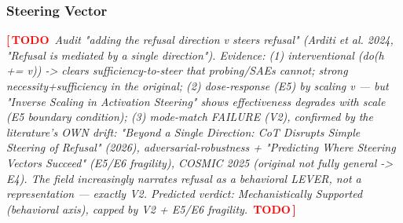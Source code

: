 \documentclass{article}
\newcommand{\TODO}[1]{\par\smallskip\noindent\textcolor{red}{\textbf{[\,TODO}}\ \textit{\textcolor{black!65}{#1}}\ \textcolor{red}{\textbf{TODO\,]}}\par\smallskip}
\begin{document}
\subsubsection{Steering Vector}
\TODO{Audit "adding the refusal direction v steers refusal" (Arditi et al. 2024, "Refusal is
mediated by a single direction"). Evidence:
(1) interventional (do(h += v)) -> clears sufficiency-to-steer that probing/SAEs cannot; strong
necessity+sufficiency in the original;
(2) dose-response (E5) by scaling v --- but "Inverse Scaling in Activation Steering" shows
effectiveness degrades with scale (E5 boundary condition);
(3) mode-match FAILURE (V2), confirmed by the literature's OWN drift: "Beyond a Single Direction:
CoT Disrupts Simple Steering of Refusal" (2026), adversarial-robustness + "Predicting Where
Steering Vectors Succeed" (E5/E6 fragility), COSMIC 2025 (original not fully general -> E4). The
field increasingly narrates refusal as a behavioral LEVER, not a representation --- exactly V2.
Predicted verdict: Mechanistically Supported (behavioral axis), capped by V2 + E5/E6 fragility.}
\end{document}
